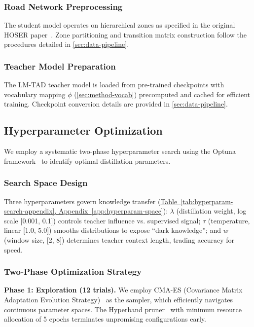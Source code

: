 \subsubsection{Road Network Preprocessing}

The student model operates on hierarchical zones as specified in the original HOSER paper~\cite{caoHolisticSemanticRepresentation2025}. Zone partitioning and transition matrix construction follow the procedures detailed in \autoref{sec:data-pipeline}.

\subsubsection{Teacher Model Preparation}

The LM-TAD teacher model is loaded from pre-trained checkpoints with vocabulary mapping $\phi$ (\autoref{sec:method-vocab}) precomputed and cached for efficient training. Checkpoint conversion details are provided in \autoref{sec:data-pipeline}.

\subsection{Hyperparameter Optimization}
\label{sec:impl-hparam}

We employ a systematic two-phase hyperparameter search using the Optuna framework~\cite{akibaOptunaNextgenerationHyperparameter2019} to identify optimal distillation parameters.

\subsubsection{Search Space Design}

Three hyperparameters govern knowledge transfer (\hyperref[app:hyperparam-space]{Table~\ref*{tab:hyperparam-search-appendix}, Appendix~\ref*{app:hyperparam-space}}): $\lambda$ (distillation weight, log scale [0.001, 0.1]) controls teacher influence vs. supervised signal; $\tau$ (temperature, linear [1.0, 5.0]) smooths distributions to expose ``dark knowledge''; and $w$ (window size, [2, 8]) determines teacher context length, trading accuracy for speed.

\subsubsection{Two-Phase Optimization Strategy}

\textbf{Phase 1: Exploration (12 trials).} We employ CMA-ES (Covariance Matrix Adaptation Evolution Strategy)~\cite{hansenCMAEvolutionStrategy2023} as the sampler, which efficiently navigates continuous parameter spaces. The Hyperband pruner~\cite{liHyperbandNovelBanditBased2018} with minimum resource allocation of 5 epochs terminates unpromising configurations early.

